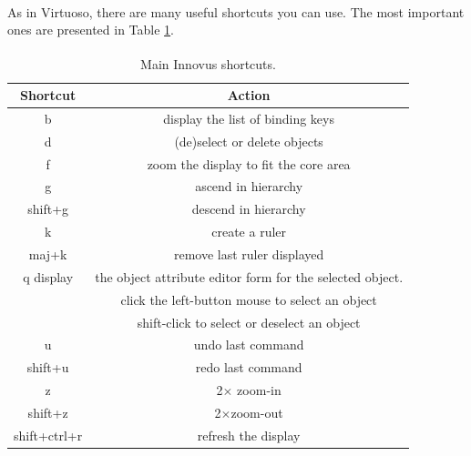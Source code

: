 As in Virtuoso\textsuperscript{\tiny\textregistered}, there are many useful shortcuts you can use. The most important ones are presented in Table \ref{shortcuts}. 
\begin{table}[h!]
	\caption{Main Innovus\textsuperscript{\tiny\textregistered} shortcuts.}
	\label{shortcuts}
\centering
	\begin{tabular}{ |c| c| }
				\hline
		\textbf{Shortcut} & \textbf{Action}  \\ 
		\hline
		b & display the list of binding keys  \\  
				\hline
		d & (de)select or delete objects    \\
				\hline
				f & zoom the display to fit the core area\\
\hline
g& ascend in hierarchy\\
\hline
shift+g& descend in hierarchy\\
\hline
k &create a ruler\\
\hline
maj+k & remove last ruler displayed\\
\hline
q display & the object attribute editor form for the selected object. \\
&click the left-button mouse to select an object\\
&shift-click to select or deselect an object\\
\hline
u & undo last command\\
\hline
shift+u & redo last command\\
\hline
z & 2$\times$ zoom-in\\
\hline
shift+z & 2$\times$zoom-out\\
\hline
shift+ctrl+r& refresh the display\\
\hline
	\end{tabular}
\end{table}



